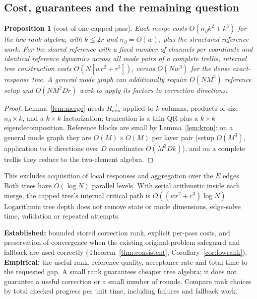 \documentclass[11pt]{article}
\theoremstyle{plain}
\newtheorem{proposition}[theorem]{Proposition}
\theoremstyle{definition}
\theoremstyle{remark}
\begin{document}
\subsection{Cost, guarantees and the remaining question}
\begin{proposition}[cost of one capped pass]\label{prop:lrcost}
Each merge costs $O(n_\partial k^2+k^3)$ for the low-rank algebra, with $k\le2r$ and $n_\partial=O(w)$, plus the structured reference work. For the shared reference with a fixed number of channels per coordinate and identical reference dynamics across all mode pairs of a complete trellis, internal tree construction costs $O(N[wr^2+r^3])$, versus $O(Nw^3)$ for the dense exact-response tree. A general mode graph can additionally require $O(NM^3)$ reference setup and $O(NM^2Dr)$ work to apply its factors to correction directions.
\end{proposition}
\begin{proof}
Lemma~\ref{lem:merge} needs $R_{mm}^{-1}$ applied to $k$ columns, products of size $n_\partial\times k$, and a $k\times k$ factorization; truncation is a thin QR plus a $k\times k$ eigendecomposition. Reference blocks are small by Lemma~\ref{lem:kron}: on a general mode graph they are $O(M)\times O(M)$ per layer pair (setup $O(M^3)$, application to $k$ directions over $D$ coordinates $O(M^2Dk)$), and on a complete trellis they reduce to the two-element algebra.
\end{proof}
This excludes acquisition of local responses and aggregation over the $E$ edges. Both trees have $O(\log N)$ parallel levels. With serial arithmetic inside each merge, the capped tree's internal critical path is $O((wr^2+r^3)\log N)$. Logarithmic tree depth does not remove state or mode dimensions, edge-solve time, validation or repeated attempts.

\textbf{Established:} bounded stored correction rank, explicit per-pass costs, and preservation of convergence when the existing original-problem safeguard and fallback are used correctly (Theorem~\ref{thm:consistent}, Corollary~\ref{cor:lowrank}).
\textbf{Empirical:} the useful rank, reference quality, acceptance rate and total time to the requested gap. A small rank guarantees cheaper tree algebra; it does not guarantee a useful correction or a small number of rounds. Compare rank choices by total checked progress per unit time, including failures and fallback work.

\end{document}
